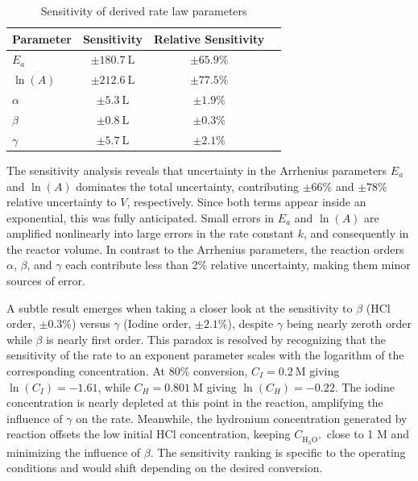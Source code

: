 \documentclass{article}
\begin{document}
\begin{table}[H]
    \caption{Sensitivity of derived rate law parameters}
    \centering
    \begin{tabular}{l|ccc}
    \toprule
    Parameter & Sensitivity & Relative Sensitivity \\
    \midrule
    $E_a$ & $\pm 180.7 \ \mathrm{L}$ & $\pm 65.9\%$ \\
    $\ln(A)$ & $\pm 212.6 \ \mathrm{L}$ & $\pm 77.5\%$ \\
    $\alpha$ & $\pm 5.3 \ \mathrm{L}$ & $\pm 1.9\%$ \\
    $\beta$ & $\pm 0.8 \ \mathrm{L}$ & $\pm 0.3\%$ \\
    $\gamma$ & $\pm 5.7 \ \mathrm{L}$ & $\pm 2.1\%$ \\
    \bottomrule
    \end{tabular}
    \label{tab:sensitivity}
\end{table}


The sensitivity analysis reveals that uncertainty in the Arrhenius parameters $E_a$ and $\ln(A)$ dominates the total uncertainty, contributing $\pm 66\%$ and $\pm 78\%$ relative uncertainty to $V$, respectively. Since both terms appear inside an exponential, this was fully anticipated. Small errors in $E_a$ and $\ln(A)$ are amplified nonlinearly into large errors in the rate constant $k$, and consequently in the reactor volume. In contrast to the Arrhenius parameters, the reaction orders $\alpha$, $\beta$, and $\gamma$ each contribute less than 2\% relative uncertainty, making them minor sources of error. 

A subtle result emerges when taking a closer look at the sensitivity to $\beta$ (HCl order, $\pm 0.3\%$) versus $\gamma$ (Iodine order, $\pm 2.1\%$), despite $\gamma$ being nearly zeroth order while $\beta$ is nearly first order. This paradox is resolved by recognizing that the sensitivity of the rate to an exponent parameter scales with the logarithm of the corresponding concentration. At 80\% conversion, $C_I = 0.2 \ \mathrm{M}$ giving $\ln(C_I) = -1.61$, while $C_H = 0.801 \ \mathrm{M}$ giving $\ln(C_H) = -0.22$. The iodine concentration is nearly depleted at this point in the reaction, amplifying the influence of $\gamma$ on the rate. Meanwhile, the hydronium concentration generated by reaction offsets the low initial HCl concentration, keeping $C_{\mathrm{H_3O^+}}$ close to 1 M and minimizing the influence of $\beta$. The sensitivity ranking is specific to the operating conditions and would shift depending on the desired conversion.
\end{document}

